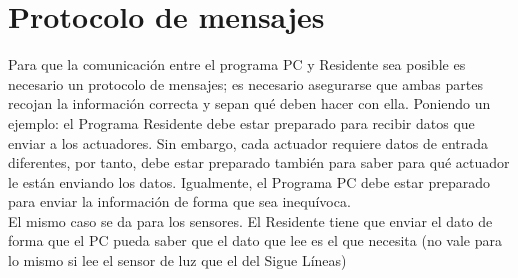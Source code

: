 \section{Protocolo de mensajes}\label{sec:protocolomensajes}
Para que la comunicación entre el programa PC y Residente sea posible es necesario un protocolo de mensajes; es necesario asegurarse que ambas partes recojan la información correcta y sepan qué deben hacer con ella. Poniendo un ejemplo: el Programa Residente debe estar preparado para recibir datos que enviar a los actuadores. Sin embargo, cada actuador requiere datos de entrada diferentes, por tanto, debe estar preparado también para saber para qué actuador le están enviando los datos. Igualmente, el Programa PC debe estar preparado para enviar la información de forma que sea inequívoca. \\
El mismo caso se da para los sensores. El Residente tiene que enviar el dato de forma que el PC pueda saber que el dato que lee es el que necesita (no vale para lo mismo si lee el sensor de luz que el del Sigue Líneas) \\


